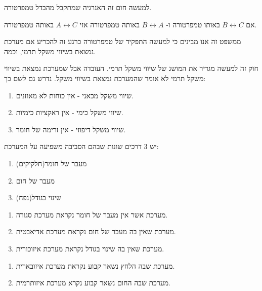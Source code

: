 \documentclass{tstextbook}
\begin{document}
\begin{remark}
למעשה חום זה האנרגיה שמתקבל מהבדל טמפרטורה.

\end{remark}
\begin{theorem}
אם \(B\leftrightarrow C\) באותו טמפרטורה ו- \(B\leftrightarrow A\) באותה טמפרטורה אזי \(A\leftrightarrow C\) באותה טמפרטורה.

\end{theorem}
\begin{remark}
ממשפט זה אנו מבינים כי למעשה התפקיד של טמפרטורה כרגע זה להכריע אם מערכת נמצאת בשיווי משקל תרמי, וכמה.

\end{remark}
חוק זה למעשה מגדיר את המושג של שיווי משקל תרמי. העובדה אבל שמערכת נמצאת בשיווי משקל תרמי לא אומר שהמערכת נמצאת בשיווי משקל. נדרש גם לשם כך:

\begin{enumerate}
  \item שיווי משקל מכאני - אין כוחות לא מאוזנים. 


  \item שיווי משקל כימי - אין ראקציות כימיות. 


  \item שיווי משקל דיפוזי - אין זרימה של חומר. 


\end{enumerate}
\begin{proposition}
יש 3 דרכים שונות שבהם הסביבה משפיעה על המערכת:

  \begin{enumerate}
    \item מעבר של חומר(חלקיקים) 


    \item מעבר של חום 


    \item שינוי בגודל(נפח) 


  \end{enumerate}
\end{proposition}
\begin{definition}
  \begin{enumerate}
    \item מערכת אשר אין מעבר של חומר נקראת מערכת סגורה. 


    \item מערכת שאין בה מעבר של חום נקראת מערכת אדיאבטית. 


    \item מערכת שאין בה שינוי בגודל נקראת מערכת איזוכורית. 


  \end{enumerate}
\end{definition}
\begin{definition}
  \begin{enumerate}
    \item מערכת שבה הלחץ נשאר קבוע נקראת מערכת איזובארית. 


    \item מערכת שבה החום נשאר קבוע נקרא מערכת איזותרמית. 


  \end{enumerate}
\end{definition}
\end{document}
